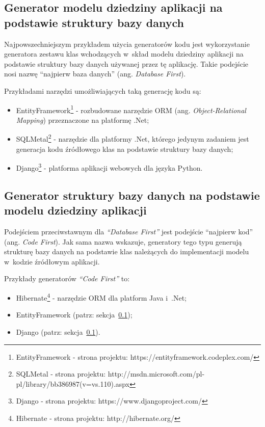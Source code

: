 \subsection{Generator modelu dziedziny aplikacji na podstawie struktury bazy danych} \label{sec:database_first}

Najpowszechniejszym przykładem użycia generatorów kodu jest wykorzystanie generatora zestawu klas wchodzących w~skład modelu dziedziny aplikacji na podstawie struktury bazy danych używanej przez tę aplikację.
Takie podejście nosi nazwę ``najpierw baza danych'' (ang. \emph{Database First}).

Przykładami narzędzi umożliwiających taką generację kodu są:

\begin{itemize}
 \item EntityFramework\footnote{EntityFramework - strona projektu: https://entityframework.codeplex.com/} - rozbudowane narzędzie ORM (ang. \emph{Object-Relational Mapping}) przeznaczone na platformę .Net;
 \item SQLMetal\footnote{SQLMetal - strona projektu: http://msdn.microsoft.com/pl-pl/library/bb386987(v=vs.110).aspx} - narzędzie dla platformy .Net, którego jedynym zadaniem jest generacja kodu źródłowego klas na podstawie struktury bazy danych;
 \item Django\footnote{Django - strona projektu: https://www.djangoproject.com/} - platforma aplikacji webowych dla języka Python.
\end{itemize}


\subsection{Generator struktury bazy danych na podstawie modelu dziedziny aplikacji}

Podejściem przeciwstawnym dla \emph{``Database First''} jest podejście ``najpierw kod'' (ang. \emph{Code First}).
Jak sama nazwa wskazuje, generatory tego typu generują strukturę bazy danych na podstawie klas należących do implementacji modelu w~kodzie źródłowym aplikacji.

Przykłady generatorów \emph{``Code First''} to:

\begin{itemize}
 \item Hibernate\footnote{Hibernate - strona projektu: http://hibernate.org/} - narzędzie ORM dla platform Java i~.Net;
 \item EntityFramework (patrz: sekcja~\ref{sec:database_first});
 \item Django (patrz: sekcja~\ref{sec:database_first}).
\end{itemize}


